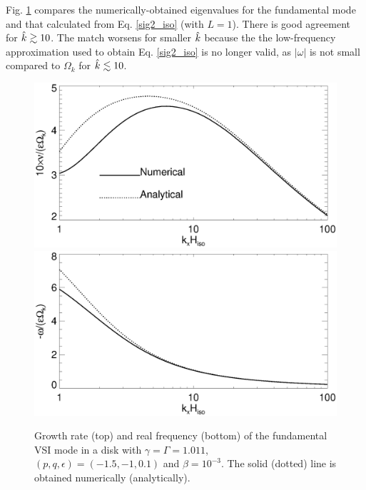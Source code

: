 
Fig. \ref{iso_eigen_kx} compares the numerically-obtained eigenvalues
for the fundamental mode and that calculated from 
Eq. \ref{sig2_iso} (with $L=1$). There is good agreement for 
$\hat{k}\gtrsim10$. The match worsens for smaller $\hat{k}$ because the 
the low-frequency approximation used to obtain Eq. \ref{sig2_iso} 
is no longer valid, as $|\omega|$ is not small compared to $\Omega_k$
for $\hat{k}\lesssim 10$.  


\begin{figure}
  \includegraphics[width=\linewidth,clip=true,trim=0cm 1.75cm 0cm
  0cm]{figures/compare_eigen_imag_iso} 
  \includegraphics[width=\linewidth,clip=true,trim=0cm 0cm 0cm
  1cm]{figures/compare_eigen_real_iso}
  \caption{Growth rate (top) and real frequency (bottom) of the
    fundamental VSI mode in a disk with $\gamma=\Gamma=1.011$,
    $(p,q,\epsilon)=(-1.5,-1,0.1)$ and
    $\beta=10^{-3}$. The solid (dotted) line is obtained numerically
    (analytically).  
    \label{iso_eigen_kx} 
  }
\end{figure}

